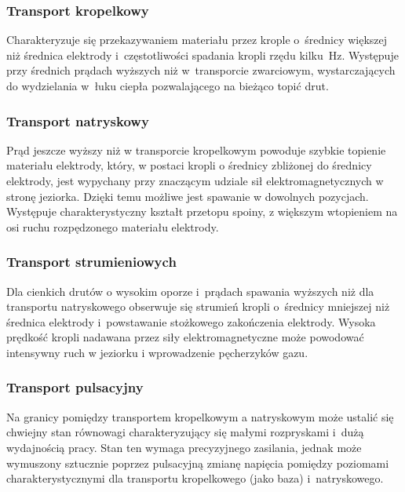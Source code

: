\documentclass{mwart}
\begin{document}
    \subsubsection{Transport kropelkowy}
    Charakteryzuje się przekazywaniem materiału przez krople o~średnicy większej niż średnica elektrody i~częstotliwości spadania kropli rzędu kilku~Hz. Występuje przy średnich prądach wyższych niż w~transporcie zwarciowym, wystarczających do wydzielania w~łuku ciepła pozwalającego na bieżąco topić drut. 
    
    \subsubsection{Transport natryskowy}
    Prąd jeszcze wyższy niż w transporcie kropelkowym powoduje szybkie topienie materiału elektrody, który, w postaci kropli o średnicy zbliżonej do średnicy elektrody, jest wypychany przy znaczącym udziale sił elektromagnetycznych w stronę jeziorka. Dzięki temu możliwe jest spawanie w dowolnych pozycjach\cite{naidu_modeling_2003}. Występuje charakterystyczny kształt przetopu spoiny, z większym wtopieniem na osi ruchu rozpędzonego materiału elektrody.
    
    \subsubsection{Transport strumieniowych}
    Dla cienkich drutów o wysokim oporze i~prądach spawania wyższych niż dla transportu natryskowego obserwuje się strumień kropli o~średnicy mniejszej niż średnica elektrody i~powstawanie stożkowego zakończenia elektrody. Wysoka prędkość kropli nadawana przez siły elektromagnetyczne może powodować intensywny ruch w jeziorku i wprowadzenie pęcherzyków gazu\cite{norrish_gas_2006}.
    
    \subsubsection{Transport pulsacyjny}
    Na granicy pomiędzy transportem kropelkowym a natryskowym może ustalić się chwiejny stan równowagi charakteryzujący się małymi rozpryskami i~dużą wydajnością pracy\cite{norrish_gas_2006}. Stan ten wymaga precyzyjnego zasilania, jednak może wymuszony sztucznie poprzez pulsacyjną zmianę napięcia pomiędzy poziomami charakterystycznymi dla transportu kropelkowego (jako baza) i~natryskowego\cite{naidu_modeling_2003}.
\end{document}
